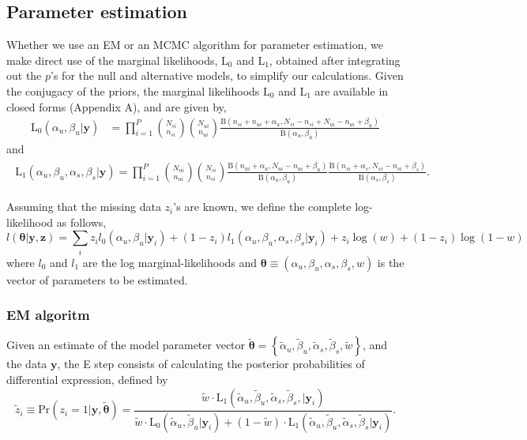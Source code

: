 \documentclass[11pt]{article}
\begin{document}
\subsection{Parameter estimation}
\label{sec:estimation}
Whether we use an EM or an MCMC algorithm for parameter estimation, we make direct use of the marginal likelihoods, $\mathrm{L}_0$ and $\mathrm{L}_1$, obtained after integrating out the $p$'s for the null and alternative models, to simplify our calculations. Given the conjugacy of the priors, the marginal likelihoods $\mathrm{L}_0$ and $\mathrm{L}_1$ are available in closed forms (Appendix A), and are given by,
 \begin{align}
  	\mathrm{L}_0(\alpha_u,\beta_u|\mathbf{y})
	&=\prod_{i=1}^P\binom{N_{si}}{n_{si}}\binom{N_{ui}}{n_{ui}}\frac{\mathrm{B}(n_{si}+n_{ui}+\alpha_u,N_{si}-n_{si}+N_{ui}-n_{ui}+\beta_u)}{\mathrm{B}(\alpha_u,\beta_u)}\label{eq:model1post}
 \end{align} 
and
\begin{align}
	\begin{split}
\mathrm{L}_1(\alpha_u,\beta_u,\alpha_s,\beta_s|\mathbf{y}) 
=\prod_{i=1}^P\binom{N_{ui}}{n_{ui}} \binom{N_{si}}{n_{si}}\frac{\mathrm{B}(n_{ui}+\alpha_u,N_{ui}-n_{ui}+\beta_u)}{\mathrm{B}(\alpha_u,\beta_u)}\frac{\mathrm{B}(n_{si}+\alpha_s,N_{si}-n_{si}+\beta_s)}{\mathrm{B}(\alpha_s,\beta_s)}.\label{model2:unconstrained}
\end{split}
\end{align}

Assuming that the missing data $z_i$'s are known, we define the complete log-likelihood as follows,
\begin{equation}
l(\boldsymbol{\theta}|\mathbf{y},\mathbf{z})=\sum_i z_i l_0(\alpha_u, \beta_u|\mathbf{y}_i) +(1-z_i) l_1(\alpha_u, \beta_u, \alpha_s, \beta_s|\mathbf{y}_i)+z_i\log(w)+(1-z_i)\log(1-w)
\label{eq:cll}
\end{equation}
where $l_0$ and $l_1$ are the log marginal-likelihoods and $\boldsymbol{\theta}\equiv(\alpha_u, \beta_u, \alpha_s,\beta_s, w)$ is the vector of parameters to be estimated.

\subsubsection{EM algoritm}
Given an estimate of the model parameter vector $\tilde{\boldsymbol{\theta}}=\left\{\tilde{\alpha}_u,\tilde{\beta}_u,\tilde{\alpha}_s,\tilde{\beta}_s,\tilde{w}\right\}$, and the data $\mathbf{y}$, the E step consists of calculating the posterior probabilities of differential expression, defined by
\[
\tilde z_{i} \equiv \mathrm{Pr}(z_i=1|\mathbf{y},\tilde{\boldsymbol{\theta}})=\frac{\tilde{w} \cdot \mathrm{L}_1(\tilde{\alpha}_u,\tilde{\beta}_u,\tilde{\alpha}_s,\tilde{\beta}_s,|\mathbf{y}_i)}{\tilde{w}\cdot\mathrm{L}_0(\tilde{\alpha}_u,\tilde{\beta}_u|\mathbf{y}_i)+(1-\tilde{w})\cdot\mathrm{L}_1(\tilde{\alpha}_u,\tilde{\beta}_u,\tilde{\alpha}_s,\tilde{\beta}_s|\mathbf{y}_i)}.
\]
\end{document}
